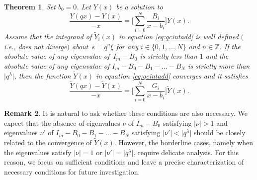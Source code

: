 \documentclass[pdftex]{sigma}
\numberwithin{equation}{section}
\newtheorem{Theorem}{Theorem}[section]
\theoremstyle{definition}
\newtheorem{Remark}[Theorem]{Remark}
\begin{document}
\begin{Theorem} \label{thm:suffcondconv}
Set $b_0=0$.
Let $Y(x)$ be a solution to
\begin{equation*}
\frac{Y(q x) - Y(x )}{-x} = \Biggl[ \sum^{N}_{i = 0}\frac{B_{i}}{x -b_{i}} \Biggr] Y(x).
\end{equation*}
Assume that the integrand of $\widetilde{Y}_{i} (x) $ in equation \eqref{eq:qcintadd} is well defined $($i.e., does not diverge$)$ about~${s= q^n \xi }$ for any $i \in \{ 0 , 1, \dots , N \}$ and $n \in \mathbb{Z} $.
If the absolute value of any eigenvalue of~${I_m - B_0}$ is strictly less than $1$ and the absolute value of any eigenvalue of $I_m - B_0 -B_1 - \dots - B_N$ is strictly more than $\big|q^{\lambda }\big|$, then the function $\widetilde{Y}(x)$ in equation \eqref{eq:qcintadd} converges and it satisfies
\begin{equation*}
\frac{\widetilde{Y}(q x) - \widetilde{Y}(x )}{-x} = \Biggl[ \sum^{N}_{i = 0}\frac{G_{i}}{x -b_{i}} \Biggr] \widetilde{Y}(x).
\end{equation*}
\end{Theorem}
\begin{Remark}
It is natural to ask whether these conditions are also necessary.
We expect that the absence of eigenvalues $\nu$ of $I_m - B_0$ satisfying $|\nu| > 1$ and eigenvalues $\nu'$ of $I_m - B_0 -B_1 - \dots - B_N$ satisfying $|\nu'| < \big|q^{\lambda }\big|$ should be closely related to the convergence of $\widetilde{Y}(x )$.
However, the borderline cases, namely when the eigenvalues satisfy $|\nu| = 1$ or $|\nu'| = \big|q^{\lambda }\big|$, require delicate analysis.
For this reason, we focus on sufficient conditions and leave a precise characterization of necessary conditions for future investigation.
\end{Remark}
\end{document}
